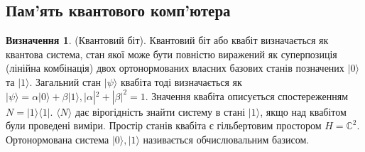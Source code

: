 \documentclass{article}
\theoremstyle{definition}
\newtheorem{definition}{Визначення}
\begin{document}
\newpage
\subsection{Пам'ять квантового комп'ютера}

\begin{definition} (Квантовий біт). Квантовий біт або квабіт визначається як квантова система,
стан якої може бути повністю виражений як суперпозиція (лінійна комбінація)
двох ортонормованих власних базових станів
позначених $|0\rangle$ та $|1\rangle$. Загальний стан $|\psi\rangle$ квабіта  тоді визначається
як $|\psi\rangle = \alpha |0\rangle + \beta |1\rangle, |\alpha|^2 + |\beta|^2 = 1$.
Значення квабіта описується спостереженням $N=|1\rangle\langle{1}|$. $\langle{N}\rangle$ дає
вірогідність знайти систему в стані $|1\rangle$, якщо над квабітом були проведені виміри.
Простір станів квабіта є гільбертовим простором $H=\mathbb{C}^2$.
Ортонормована система ${|0\rangle,|1\rangle}$ називається обчислювальним базисом.
\end{definition}
\end{document}
